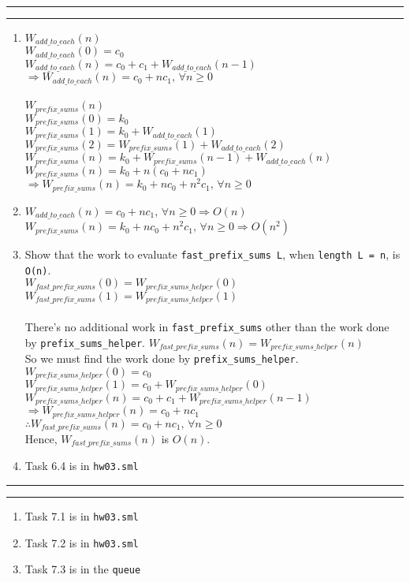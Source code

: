 \documentclass[11pt]{article}
\newcommand{\question}[2] {\vspace{.25in} \hrule\vspace{0.5em}
\noindent{\bf #1: #2} \vspace{0.5em}
\hrule \vspace{.10in}}
\begin{document}
\question{6}{Prefix Sums}
\begin{enumerate}
\item $W_{add\_to\_each}(n)$\\
$W_{add\_to\_each}(0) = c_0$\\
$W_{add\_to\_each}(n) = c_0 + c_1 + W_{add\_to\_each}(n-1)$\\
$\Rightarrow W_{add\_to\_each}(n) = c_0 + n c_1,\, \forall n \geq 0$\\\\
$W_{prefix\_sums}(n)$\\
$W_{prefix\_sums}(0) = k_0$\\
$W_{prefix\_sums}(1) = k_0 + W_{add\_to\_each}(1)$\\
$W_{prefix\_sums}(2) = W_{prefix\_sums}(1) + W_{add\_to\_each}(2)$\\
$W_{prefix\_sums}(n) = k_0 + W_{prefix\_sums}(n-1) + W_{add\_to\_each}(n)$\\
$W_{prefix\_sums}(n) = k_0 + n (c_0 + n c_1)$\\
$\Rightarrow W_{prefix\_sums}(n) = k_0 + n c_0 + n^2 c_1,\, \forall n \geq 0$\\
\item $W_{add\_to\_each}(n) = c_0 + n c_1,\, \forall n \geq 0 \Rightarrow O(n)$\\
$W_{prefix\_sums}(n) =  k_0 + n c_0 + n^2 c_1,\, \forall n \geq 0 \Rightarrow O(n^2)$
\item Show that the work to evaluate \verb|fast_prefix_sums L|, when \verb|length L = n|, is \verb|O(n)|.\\
$W_{fast\_prefix\_sums}(0) = W_{prefix\_sums\_helper}(0)$\\
$W_{fast\_prefix\_sums}(1) = W_{prefix\_sums\_helper}(1)$\\\\
There's no additional work in \verb|fast_prefix_sums| other than the work done by \verb|prefix_sums_helper|.
$W_{fast\_prefix\_sums}(n) = W_{prefix\_sums\_helper}(n)$\\
So we must find the work done by \verb|prefix_sums_helper|.\\
$W_{prefix\_sums\_helper}(0) = c_0$\\
$W_{prefix\_sums\_helper}(1) = c_0 + W_{prefix\_sums\_helper}(0)$\\
$W_{prefix\_sums\_helper}(n) = c_0 + c_1 + W_{prefix\_sums\_helper}(n-1)$\\
$\Rightarrow W_{prefix\_sums\_helper}(n) = c_0 + n c_1$\\
$\therefore W_{fast\_prefix\_sums}(n) = c_0 + n c_1,\, \forall n \geq 0$\\
Hence, $W_{fast\_prefix\_sums}(n)$ is $O(n)$.
\item Task 6.4 is in \verb|hw03.sml|
\end{enumerate}

\question{7}{Sum Nights}
\begin{enumerate}
\item Task 7.1 is in \verb|hw03.sml|
\item Task 7.2 is in \verb|hw03.sml|
\item Task 7.3 is in the \verb|queue|
\end{enumerate}
\end{document}
